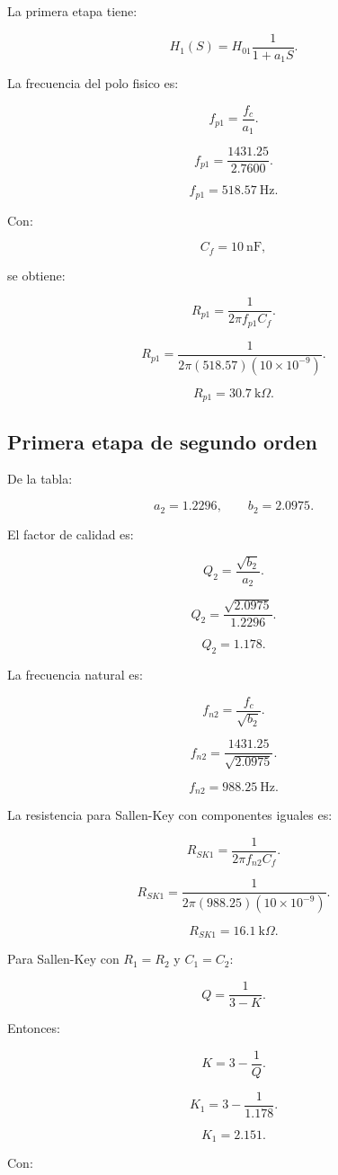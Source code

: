 \documentclass[11pt,letterpaper]{article}
\begin{document}
La primera etapa tiene:

\[
H_1(S)=H_{01}\frac{1}{1+a_1S}.
\]

La frecuencia del polo fisico es:

\[
f_{p1}=\frac{f_c}{a_1}.
\]

\[
f_{p1}=\frac{1431.25}{2.7600}.
\]

\[
f_{p1}=518.57~\text{Hz}.
\]

Con:

\[
C_f=10~\text{nF},
\]

se obtiene:

\[
R_{p1}=\frac{1}{2\pi f_{p1}C_f}.
\]

\[
R_{p1}=
\frac{1}{2\pi(518.57)(10\times10^{-9})}.
\]

\[
R_{p1}=30.7~\text{k}\Omega.
\]

\subsection{Primera etapa de segundo orden}

De la tabla:

\[
a_2=1.2296,
\qquad
b_2=2.0975.
\]

El factor de calidad es:

\[
Q_2=\frac{\sqrt{b_2}}{a_2}.
\]

\[
Q_2=\frac{\sqrt{2.0975}}{1.2296}.
\]

\[
Q_2=1.178.
\]

La frecuencia natural es:

\[
f_{n2}=\frac{f_c}{\sqrt{b_2}}.
\]

\[
f_{n2}=\frac{1431.25}{\sqrt{2.0975}}.
\]

\[
f_{n2}=988.25~\text{Hz}.
\]

La resistencia para Sallen-Key con componentes iguales es:

\[
R_{SK1}=\frac{1}{2\pi f_{n2}C_f}.
\]

\[
R_{SK1}=
\frac{1}{2\pi(988.25)(10\times10^{-9})}.
\]

\[
R_{SK1}=16.1~\text{k}\Omega.
\]

Para Sallen-Key con \(R_1=R_2\) y \(C_1=C_2\):

\[
Q=\frac{1}{3-K}.
\]

Entonces:

\[
K=3-\frac{1}{Q}.
\]

\[
K_1=3-\frac{1}{1.178}.
\]

\[
K_1=2.151.
\]

Con:
\end{document}
